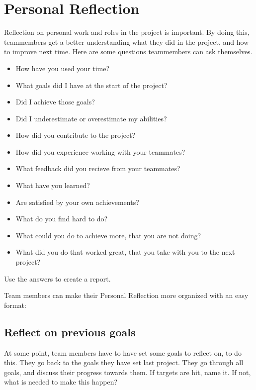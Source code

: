 \documentclass[10pt]{report}
\begin{document}
\newpage

\section{Personal Reflection}

Reflection on personal work and roles in the project is important. By doing this, teammembers get a better understanding what they did in the project, and how to improve next time. Here are some questions teammembers can ask themselves. 

\begin{itemize}
	\item How have you used your time?
	\item What goals did I have at the start of the project?
	\item Did I achieve those goals?
	\item Did I underestimate or overestimate my abilities?
	\item How did you contribute to the project?
	\item How did you experience working with your teammates?
	\item What feedback did you recieve from your teammates?
	\item What have you learned?
	\item Are satisfied by your own achievements?
	\item What do you find hard to do?
	\item What could you do to achieve more, that you are not doing?
	\item What did you do that worked great, that you take with you to the next project?
\end{itemize}

Use the answers to create a report.

\bigskip

Team members can make their Personal Reflection more organized with an easy format:

\subsection{Reflect on previous goals}

At some point, team members have to have set some goals to reflect on, to do this. They go back to the goals they have set last project. They go through all goals, and discuss their progress towards them. If targets are hit, name it. If not, what is needed to make this happen?
\end{document}
